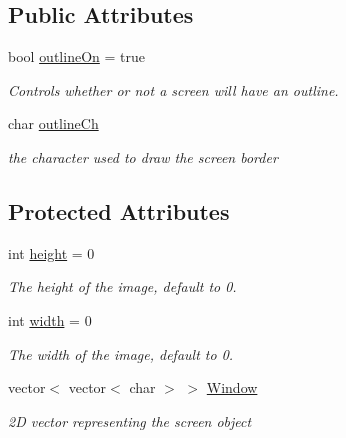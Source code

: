 \subsection*{Public Attributes}
\begin{DoxyCompactItemize}
\item 
\hypertarget{classScreen_a6f906b745f406576d9f7aeaec330c9d6}{bool \hyperlink{classScreen_a6f906b745f406576d9f7aeaec330c9d6}{outline\-On} = true}\label{classScreen_a6f906b745f406576d9f7aeaec330c9d6}

\begin{DoxyCompactList}\small\item\em Controls whether or not a screen will have an outline. \end{DoxyCompactList}\item 
\hypertarget{classScreen_a0b59df2bfafff7a121286a5ea40503b6}{char \hyperlink{classScreen_a0b59df2bfafff7a121286a5ea40503b6}{outline\-Ch}}\label{classScreen_a0b59df2bfafff7a121286a5ea40503b6}

\begin{DoxyCompactList}\small\item\em the character used to draw the screen border \end{DoxyCompactList}\end{DoxyCompactItemize}
\subsection*{Protected Attributes}
\begin{DoxyCompactItemize}
\item 
\hypertarget{classScreen_a55405920693276db8fbdbf3a903b8d2f}{int \hyperlink{classScreen_a55405920693276db8fbdbf3a903b8d2f}{height} = 0}\label{classScreen_a55405920693276db8fbdbf3a903b8d2f}

\begin{DoxyCompactList}\small\item\em The height of the image, default to 0. \end{DoxyCompactList}\item 
\hypertarget{classScreen_a49be8f8ccf7ed7a3151a761495c0ce21}{int \hyperlink{classScreen_a49be8f8ccf7ed7a3151a761495c0ce21}{width} = 0}\label{classScreen_a49be8f8ccf7ed7a3151a761495c0ce21}

\begin{DoxyCompactList}\small\item\em The width of the image, default to 0. \end{DoxyCompactList}\item 
\hypertarget{classScreen_a7349f56b4976f03dc9977dc613a8bbab}{vector$<$ vector$<$ char $>$ $>$ \hyperlink{classScreen_a7349f56b4976f03dc9977dc613a8bbab}{Window}}\label{classScreen_a7349f56b4976f03dc9977dc613a8bbab}

\begin{DoxyCompactList}\small\item\em 2\-D vector representing the screen object \end{DoxyCompactList}\end{DoxyCompactItemize}
